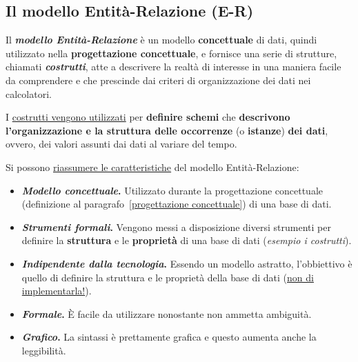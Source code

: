 \documentclass[a4paper]{article}
\begin{document}
	\newpage
	
	
	
	
	\subsection{Il modello Entità-Relazione (E-R)}
	
	Il \textcolor{Red3}{\textbf{\emph{modello Entità-Relazione}}} è un modello \textbf{concettuale} di dati, quindi utilizzato nella \textbf{progettazione concettuale}, e fornisce una serie di strutture, chiamati \textbf{\emph{costrutti}}, atte a descrivere la realtà di interesse in una maniera facile da comprendere e che prescinde dai criteri di organizzazione dei dati nei calcolatori.
	
	I \underline{costrutti vengono utilizzati} per \textbf{definire schemi} che \textbf{descrivono l'organizzazione e la struttura delle occorrenze} (o \textbf{istanze}) \textbf{dei dati}, ovvero, dei valori assunti dai dati al variare del tempo.
	
	\noindent
	Si possono \underline{riassumere le caratteristiche} del modello Entità-Relazione:
	
	\begin{itemize}
		\item[\ding{42}] \textcolor{SpringGreen4}{\textbf{\emph{Modello concettuale}.}} Utilizzato durante la progettazione concettuale (definizione al paragrafo~\ref{progettazione concettuale}) di una base di dati.
		
		\item[\ding{42}] \textcolor{SpringGreen4}{\textbf{\emph{Strumenti formali}.}} Vengono messi a disposizione diversi strumenti per definire la \textbf{struttura} e le \textbf{proprietà} di una base di dati (\emph{esempio i costrutti}).
		
		\item[\ding{42}] \textcolor{SpringGreen4}{\textbf{\emph{Indipendente dalla tecnologia}.}} Essendo un modello astratto, l'obbiettivo è quello di definire la struttura e le proprietà della base di dati (\underline{non di implementarla!}).
		
		\item[\ding{42}] \textcolor{SpringGreen4}{\textbf{\emph{Formale}.}} È facile da utilizzare nonostante non ammetta ambiguità.
		
		\item[\ding{42}] \textcolor{SpringGreen4}{\textbf{\emph{Grafico}.}} La sintassi è prettamente grafica e questo aumenta anche la leggibilità.
	\end{itemize}
\end{document}
